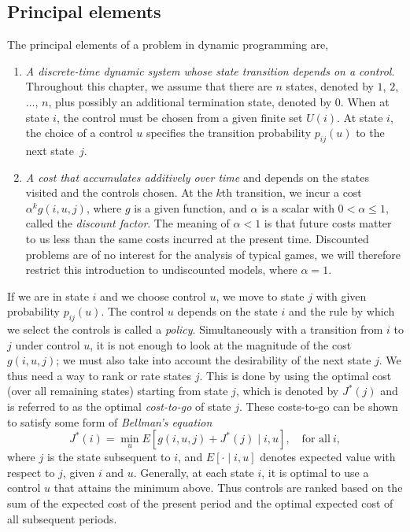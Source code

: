 \subsection{Principal elements} \label{sec:principalelements}
The principal elements of a problem in dynamic programming are,
\begin{enumerate}
\item \emph{A discrete-time dynamic system whose state transition depends on a control}. Throughout this chapter, we assume that there are $n$ states, denoted by $1$, $2$, $\ldots$, $n$, plus possibly an additional termination state, denoted by 0. When at state $i$, the control must be chosen from a given finite set $U(i)$. At state $i$, the choice of a control $u$ specifies the transition probability $p_{ij}(u)$ to the next state~$j$. 

\item \emph{A cost that accumulates additively over time} and depends on the states visited and the controls chosen. At the $k$th transition, we incur a cost $\alpha^kg(i,u,j)$, where $g$ is a given function, and $\alpha$ is a scalar with $0 < \alpha \leq 1$, called the \emph{discount factor}. The meaning of $\alpha < 1$ is that future costs matter to us less than the same costs incurred at the present time. Discounted problems are of no interest for the analysis of typical games, we will therefore restrict this introduction to undiscounted models, where $\alpha = 1$.
\end{enumerate}

If we are in state $i$ and we choose control $u$, we move to state $j$ with given probability $p_{ij}(u)$. 
The control $u$ depends on the state $i$ and the rule by which we select the controls is called a \emph{policy}. Simultaneously with a transition from $i$ to $j$ under control $u$, it is not enough to look at the magnitude of the cost $g(i, u, j)$; we must also take into account the desirability of the next state $j$. We thus need a way to rank or rate states $j$. This is done by using the optimal cost (over all remaining states) starting from state $j$, which is denoted by $J^*(j)$ and is referred to as the optimal \emph{cost-to-go} of state $j$. These costs-to-go can be shown to satisfy some form of \emph{Bellman's equation}
$$J^*(i) = \min_u E \left [ g(i,u,j) + J^*(j) \mid i,u \right ], \quad \mbox{for all}\ i,$$
where $j$ is the state subsequent to $i$, and $E[\cdot \mid i,u]$ denotes expected value with respect to $j$, given $i$ and $u$. Generally, at each state $i$, it is optimal to use a control $u$ that attains the minimum above. Thus controls are ranked based on the sum of the expected cost of the present period and the optimal expected cost of all subsequent periods.

